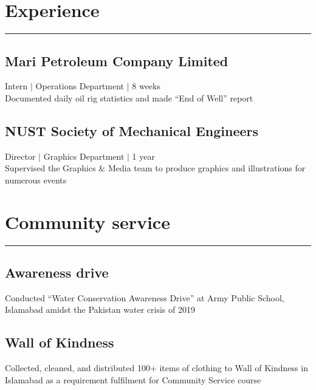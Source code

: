 \documentclass[a4paper, 11pt]{article}
\begin{document}
	\vspace{-6pt}
	\section*{Experience}
	\vspace{-6pt}
	\hrule
	\vspace{12pt}

	\subsection*{Mari Petroleum Company Limited}
	\vspace{-6pt}
	Intern $\vert$ Operations Department $\vert$ 8 weeks \\
	Documented daily oil rig statistics and made “End of Well” report
	\vspace{-12pt}

	\subsection*{NUST Society of Mechanical Engineers}
	\vspace{-6pt}
	Director $\vert$ Graphics Department $\vert$ 1 year \\
	Supervised the Graphics \& Media team to produce graphics and illustrations for numerous events

	
	\vspace{-6pt}
	\section*{Community service}
	\vspace{-6pt}
	\hrule
	\vspace{12pt}

	\subsection*{Awareness drive}
	\vspace{-6pt}
	Conducted ``Water Conservation Awareness Drive'' at Army Public School, Islamabad amidst the Pakistan water crisis of 2019
	\vspace{-12pt}

	\subsection*{Wall of Kindness}
	\vspace{-6pt}
	Collected, cleaned, and distributed 100+ items of clothing to Wall of Kindness in Islamabad as a requirement fulfilment for Community Service course
	\vspace{-12pt}
\end{document}
